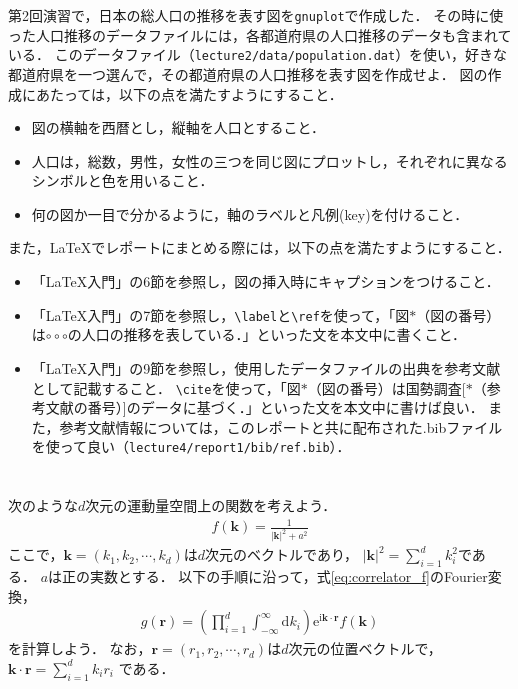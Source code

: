 \documentclass[a4paper,12pt]{jsarticle}
\begin{document}
第2回演習で，日本の総人口の推移を表す図を\texttt{gnuplot}で作成した．
その時に使った人口推移のデータファイルには，各都道府県の人口推移のデータも含まれている．
このデータファイル（\texttt{lecture2/data/population.dat}）を使い，好きな都道府県を一つ選んで，その都道府県の人口推移を表す図を作成せよ．
図の作成にあたっては，以下の点を満たすようにすること．
\begin{itemize}
    \item 図の横軸を西暦とし，縦軸を人口とすること．
    \item 人口は，総数，男性，女性の三つを同じ図にプロットし，それぞれに異なるシンボルと色を用いること．
    \item 何の図か一目で分かるように，軸のラベルと凡例(key)を付けること．
\end{itemize}
また，\LaTeX でレポートにまとめる際には，以下の点を満たすようにすること．
\begin{itemize}
    \item 「\LaTeX 入門」の6節を参照し，図の挿入時にキャプションをつけること．
    \item 「\LaTeX 入門」の7節を参照し，\texttt{\textbackslash label}と\texttt{\textbackslash ref}を使って，「図$*$（図の番号）は$\circ\circ\circ$の人口の推移を表している．」といった文を本文中に書くこと．
    \item 「\LaTeX 入門」の9節を参照し，使用したデータファイルの出典を参考文献として記載すること．
    \texttt{\textbackslash cite}を使って，「図$*$（図の番号）は国勢調査[$*$（参考文献の番号）]のデータに基づく．」といった文を本文中に書けば良い．
    また，参考文献情報については，このレポートと共に配布された.bibファイルを使って良い（\texttt{lecture4/report1/bib/ref.bib}）．
\end{itemize}


\section{}
\label{sec:problem_4}

次のような$d$次元の運動量空間上の関数を考えよう．
\begin{align}
\label{eq:correlator_f}
    f(\bm{k})=\frac{1}{|\bm{k}|^{2}+a^{2}}
\end{align}
ここで，$\bm{k}=(k_{1},k_{2},\cdots,k_{d})$は$d$次元のベクトルであり，
$|\bm{k}|^{2}=\sum_{i=1}^{d}k_{i}^{2}$である．
$a$は正の実数とする．
以下の手順に沿って，式\eqref{eq:correlator_f}のFourier変換，
\begin{align}
\label{eq:correlator_g}
    g(\bm{r})
    =
    \left(\prod_{i=1}^{d}\int^{\infty}_{-\infty}\mathrm{d}k_{i}\right)
    \mathrm{e}^{\mathrm{i}\bm{k}\cdot\bm{r}}
    f(\bm{k})
\end{align}
を計算しよう．
なお，$\bm{r}=(r_{1},r_{2},\cdots,r_{d})$は$d$次元の位置ベクトルで，
$\bm{k}\cdot\bm{r}=\sum_{i=1}^{d}k_{i}r_{i}$
である．\\
\end{document}
